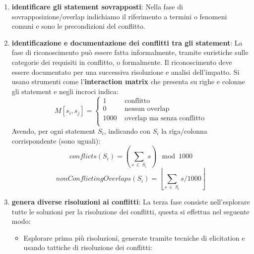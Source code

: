 \begin{enumerate}
      \item \textbf{identificare gli statement sovrapposti}: 
            Nella fase di sovrapposizione/overlap indichiamo il riferimento a
            termini o fenomeni comuni e sono le precondizioni del conflitto.
      \item \textbf{identificazione e documentazione dei conflitti tra gli statement}: 
            La fase di riconoscimento può essere fatta informalmente, tramite
            euristiche sulle categorie dei requisiti in conflitto, o formalmente.
            Il riconoscimento deve essere documentato per una successiva risoluzione
            e analisi dell'impatto. Si usano strumenti come l'\textbf{interaction
                  matrix} che presenta su righe e colonne gli statement e
            negli incroci indica:
            \begin{equation}
                  M[s_i,s_j] = \begin{cases}
                        1    & \text{ conflitto}                  \\
                        0    & \text{ nessun overlap}             \\
                        1000 & \text{ overlap ma senza conflitto} \\
                  \end{cases}
            \end{equation}
            Avendo, per ogni statement $S_i$, indicando con $S_i$ la riga/colonna
            corrispondente (sono uguali):
            \begin{equation}
                  conflicts(S_i) = \left(\sum_{s \ \in \ S_i} s \right) \mod 1000
            \end{equation}
            \begin{equation}
                  nonConflictingOverlaps(S_i) = \left\lfloor \sum_{s \ \in \
                        S_i} s / 1000 \right\rfloor
            \end{equation}
      \item \textbf{genera diverse risoluzioni ai conflitti}: 
            La terza fase consiste nell'esplorare tutte le soluzioni per la risoluzione
            dei conflitti, questa si effettua nel seguente modo:
            \begin{itemize}
                  \item Esplorare prima più risoluzioni, generate tramite tecniche
                        di elicitation e usando tattiche di risoluzione dei conflitti:

\end{itemize}
\end{enumerate}
